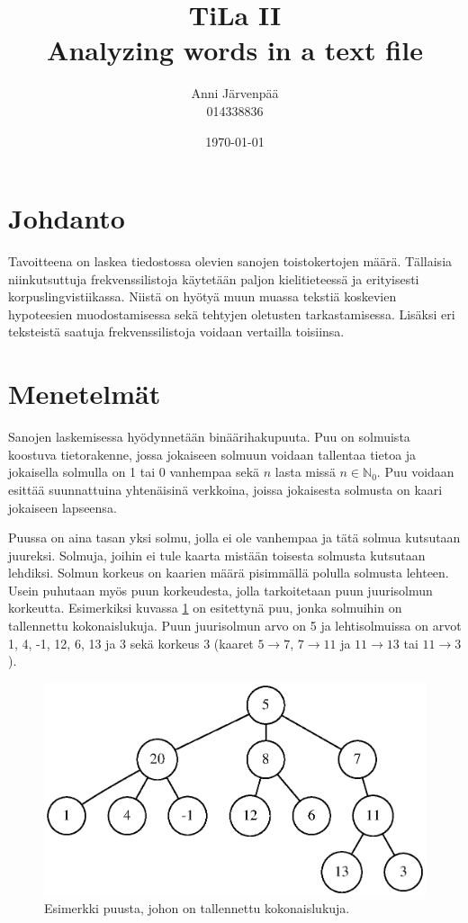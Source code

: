 \documentclass[12pt,a4paper,titlepage]{article}
\title{TiLa II \\ Analyzing words in a text file \vspace{0.5em}}
\author{\begin{tabular}{c}
Anni Järvenpää \\ 014338836
\end{tabular}}
\date{\today}
\begin{document}
\maketitle

\newpage
\null
\thispagestyle{empty}
\addtocounter{page}{-1}
\newpage

\section{Johdanto}
Tavoitteena on laskea tiedostossa olevien sanojen toistokertojen määrä. Tällaisia niinkutsuttuja frekvenssilistoja käytetään paljon kielitieteessä ja erityisesti korpuslingvistiikassa. Niistä on hyötyä muun muassa tekstiä koskevien hypoteesien muodostamisessa sekä tehtyjen oletusten tarkastamisessa. Lisäksi eri teksteistä saatuja frekvenssilistoja voidaan vertailla toisiinsa. \cite{kilitiede} %

\section{Menetelmät}
Sanojen laskemisessa hyödynnetään binäärihakupuuta. Puu on solmuista koostuva tietorakenne, jossa jokaiseen solmuun voidaan tallentaa tietoa ja jokaisella solmulla on 1 tai 0 vanhempaa sekä $n$ lasta missä $n \in \mathbb{N}_0$. Puu voidaan esittää suunnattuina yhtenäisinä verkkoina, joissa jokaisesta solmusta on kaari jokaiseen lapseensa. \cite{cormen}

Puussa on aina tasan yksi solmu, jolla ei ole vanhempaa ja tätä solmua kutsutaan juureksi. Solmuja, joihin ei tule kaarta mistään toisesta solmusta kutsutaan lehdiksi. Solmun korkeus on kaarien määrä pisimmällä polulla solmusta lehteen. Usein puhutaan myös puun korkeudesta, jolla tarkoitetaan puun juurisolmun korkeutta. Esimerkiksi kuvassa \ref{yleinenpuu} on esitettynä puu, jonka solmuihin on tallennettu kokonaislukuja. Puun juurisolmun arvo on 5 ja lehtisolmuissa on arvot 1, 4, -1, 12, 6, 13 ja 3 sekä korkeus 3 (kaaret $5 \rightarrow 7$, $7 \rightarrow 11$ ja $11 \rightarrow 13$ tai $11 \rightarrow 3$). \cite{cormen}

\begin{figure}
\centering
\includegraphics[width=13cm]{graphs/puu.eps}
\caption{Esimerkki puusta, johon on tallennettu kokonaislukuja.}
\label{yleinenpuu}
\end{figure}
\end{document}
